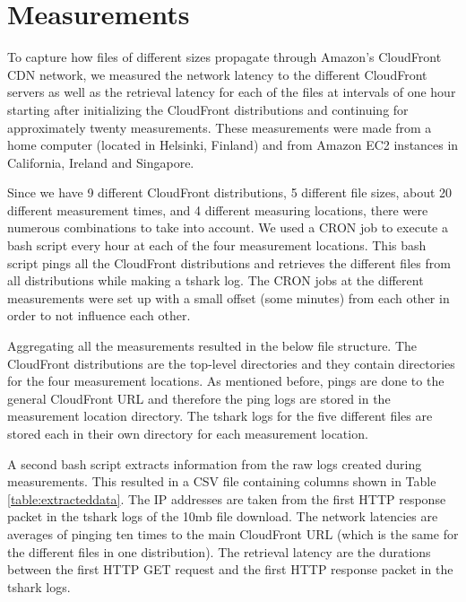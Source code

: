 \documentclass[conference]{IEEEtran}
\begin{document}
\section{Measurements}
To capture how files of different sizes propagate through Amazon's CloudFront CDN network, we measured the network latency to the different CloudFront servers as well as the retrieval latency for each of the files at intervals of one hour starting after initializing the CloudFront distributions and continuing for approximately twenty measurements. These measurements were made from a home computer (located in Helsinki, Finland) and from Amazon EC2 instances in California, Ireland and Singapore.

Since we have 9 different CloudFront distributions, 5 different file sizes, about 20 different measurement times, and 4 different measuring locations, there were numerous combinations to take into account. We used a CRON job to execute a bash script every hour at each of the four measurement locations. This bash script pings all the CloudFront distributions and retrieves the different files from all distributions while making a tshark log. The CRON jobs at the different measurements were set up with a small offset (some minutes) from each other in order to not influence each other.

Aggregating all the measurements resulted in the below file structure. The CloudFront distributions are the top-level directories and they contain directories for the four measurement locations. As mentioned before, pings are done to the general CloudFront URL and therefore the ping logs are stored in the measurement location directory. The tshark logs for the five different files are stored each in their own directory for each measurement location. \\


A second bash script extracts information from the raw logs created during measurements. This resulted in a CSV file containing columns shown in Table \ref{table:extracteddata}. The IP addresses are taken from the first HTTP response packet in the tshark logs of the 10mb file download. The network latencies are averages of pinging ten times to the main CloudFront URL (which is the same for the different files in one distribution). The retrieval latency are the durations between the first HTTP GET request and the first HTTP response packet in the tshark logs.
\end{document}
